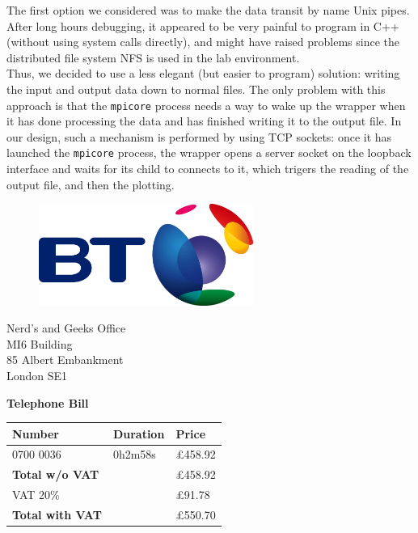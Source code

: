 \documentclass[11pt,a4paper]{article}
\begin{document}
The first option we considered was to make the data transit by name Unix pipes. After long hours debugging, it appeared to be very painful to program in C++ (without using system calls directly), and might have raised problems since the distributed file system NFS is used in the lab environment.\\

Thus, we decided to use a less elegant (but easier to program) solution: writing the input and output data down to normal files. The only problem with this approach is that the \verb_mpicore_ process needs a way to wake up the wrapper when it has done processing the data and has finished writing it to the output file. In our design, such a mechanism is performed by using TCP sockets: once it has launched the \verb_mpicore_ process, the wrapper opens a server socket on the loopback interface and waits for its child to connects to it, which trigers the reading of the output file, and then the plotting.

\newpage

\begin{figure}[!h]
\includegraphics[width=7cm]{bt.jpg}
\end{figure}

\raggedleft
Nerd's and Geeks Office\\
MI6 Building\\
85 Albert Embankment\\
London SE1\\

\raggedright
\vspace{1cm}
\Huge{\textbf{Telephone Bill}}

\vspace{1cm}

\normalsize

\begin{tabularx}{\textwidth}{X X X}
  Number & Duration & Price \\
  \hline
  0700 0036 & 0h2m58s & \pounds458.92 \\
  \hline
  \textbf{Total w/o VAT} &  & \pounds458.92 \\
  \hline
  VAT 20\% & & \pounds91.78 \\
  \hline
  \textbf{Total with VAT} & & \pounds550.70 \\
\end{tabularx}
\end{document}
